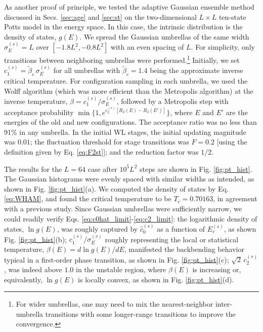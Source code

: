 \documentclass[reprint, superscriptaddress, floatfix]{revtex4-1}
\newcommand{\note}[1]{{\color{DarkGreen}\footnotesize \textsc{Note.} #1}}
\begin{document}
As another proof of principle,
we tested the adaptive Gaussian ensemble method
discussed in Secs. \ref{sec:age} and \ref{sec:st}
on the two-dimensional $L\times L$ ten-state
Potts model\cite{wu1982, newman, wang2001, wang2001pre}
in the energy space.
%
In this case, %
the intrinsic distribution is
the density of states, $g(E)$.
%
We spread the Gaussian umbrellas
of the same width $\sigma_E^{(s)} = L$ over $[-1.8L^2, -0.8L^2]$
with an even spacing of $L$.
%
For simplicity, only transitions between neighboring
umbrellas were performed.\footnote{For
  wider umbrellas,
  one may need to mix the nearest-neighbor inter-umbrella transitions
  with some longer-range transitions
  to improve the convergence.}
%
%
Initially, we set
$c_1^{(s)} = \tilde \beta_c \, \sigma_E^{(s)}$
for all umbrellas
with $\tilde \beta_c = 1.4$
being the approximate inverse critical temperature.
%
For configuration sampling in each umbrella,
we used the Wolff algorithm\cite{wolff1989, newman}
(which was more efficient than the Metropolis algorithm)
at the inverse temperature, $\beta = c_1^{(s)}/\sigma_E^{(s)}$,
followed by a Metropolis step with
acceptance probability
$\min\bigl\{1, e^{c_2^{(s)} [R_2(E) - R_2(E')]} \bigr\}$,
where $E$ and $E'$ are the energies of the old and new configurations.
%
The acceptance ratio was no less than 91\% in any umbrella.
%
In the initial WL stages,
the initial updating magnitude was $0.01$;
the fluctuation threshold for stage transitions
was $F = 0.2$ [using the definition given by Eq. \eqref{eq:F2st}];
and the reduction factor was $1/2$.

The results for the $L = 64$ case
after $10^5 L^2$ steps are shown
in Fig. \ref{fig:pt_hist}.
%
The Gaussian histograms were evenly spaced with similar widths as intended,
as shown in Fig. \ref{fig:pt_hist}(a).
%
We computed the density of states by Eq. \eqref{eq:WHAM},
and found the critical temperature to be $T_c = 0.70163$,
in agreement with a previous study\cite{wang2001pre}.
%
Since Gaussian umbrellas were sufficiently narrow,
we could readily verify
Eqs. \eqref{eq:c0hat_limit}-\eqref{eq:c2_limit}:
the logarithmic density of states, $\ln g(E)$,
was roughly captured
by $\hat c_0^{(s)}$ as a function of $E_c^{(s)}$,
as shown Fig. \ref{fig:pt_hist}(b);
%
$c_1^{(s)}/\sigma_E^{(s)}$ roughly representing
the local or statistical temperature, $\beta(E) = d\ln g(E)/dE$,
manifested the backbending behavior\cite{kim2006, *kim2007, kim2010}
typical in a first-order phase transition,
as shown in Fig. \ref{fig:pt_hist}(c);
%
$\sqrt 2 \, c_2^{(s)}$,
was indeed above $1.0$
in the unstable region,
where $\beta(E)$ is increasing or, equivalently,
$\ln g(E)$ is locally convex,
as shown in Fig. \ref{fig:pt_hist}(d).
\end{document}
